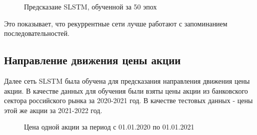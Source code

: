 \documentclass[a4paper,fontsize=12pt,titlepage,final]{scrartcl}
\begin{document}
\begin{figure}[!h]
\caption{Предсказаие SLSTM, обученной за 50 эпох}\label{ris:sinx_trend}
\end{figure}

Это показывает, что рекуррентные сети лучше работают с запоминанием последовательностей.

\subsection{Направление движения цены акции}

Далее сеть SLSTM была обучена для предсказания направления движения цены акции. В качестве данных для обучения были взяты цены акции из банковского сектора российского рынка за 2020-2021 год. В качестве тестовых данных - цены этой же акции за 2021-2022 год.

\begin{figure}[!h]
\caption{Цена одной акции за период с 01.01.2020 по 01.01.2021}\label{ris:sinx_trend}
\end{figure}
\end{document}
